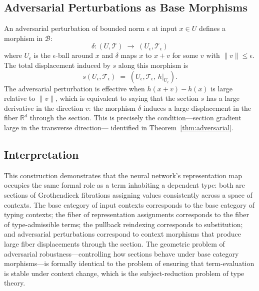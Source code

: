 \documentclass[12pt,a4paper]{article}
\theoremstyle{plain}
\theoremstyle{definition}
\newcommand{\B}{\mathcal{B}}
\begin{document}
\subsection*{Adversarial Perturbations as Base Morphisms}

An adversarial perturbation of bounded norm $\epsilon$ at input $x \in U$
defines a morphism in $\B$:
\[
\delta : (U, \mathcal{T}) \;\longrightarrow\; (U_\epsilon, \mathcal{T}_\epsilon)
\]
where $U_\epsilon$ is the $\epsilon$-ball around $x$ and $\delta$ maps $x$ to
$x + v$ for some $v$ with $\|v\| \leq \epsilon$. The total displacement induced
by $s$ along this morphism is
\[
s(U_\epsilon, \mathcal{T}_\epsilon) \;=\;
(U_\epsilon, \mathcal{T}_\epsilon,\, h|_{U_\epsilon}).
\]
The adversarial perturbation is effective when $h(x + v) - h(x)$ is large
relative to $\|v\|$, which is equivalent to saying that the section $s$ has
a large derivative in the direction $v$: the morphism $\delta$ induces a large
displacement in the fiber $\mathbb{R}^d$ through the section. This is
precisely the condition---section gradient large in the transverse direction---
identified in Theorem~\ref{thm:adversarial}.

\subsection*{Interpretation}

This construction demonstrates that the neural network's representation map
occupies the same formal role as a term inhabiting a dependent type: both are
sections of Grothendieck fibrations assigning values consistently across a space
of contexts. The base category of input contexts corresponds to the base category
of typing contexts; the fiber of representation assignments corresponds to the
fiber of type-admissible terms; the pullback reindexing corresponds to
substitution; and adversarial perturbations correspond to context morphisms that
produce large fiber displacements through the section. The geometric problem
of adversarial robustness---controlling how sections behave under base
category morphisms---is formally identical to the problem of ensuring that
term-evaluation is stable under context change, which is the subject-reduction
problem of type theory.
\end{document}
